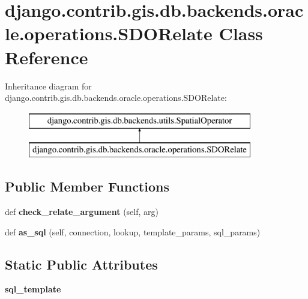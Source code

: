 \hypertarget{classdjango_1_1contrib_1_1gis_1_1db_1_1backends_1_1oracle_1_1operations_1_1_s_d_o_relate}{}\section{django.\+contrib.\+gis.\+db.\+backends.\+oracle.\+operations.\+S\+D\+O\+Relate Class Reference}
\label{classdjango_1_1contrib_1_1gis_1_1db_1_1backends_1_1oracle_1_1operations_1_1_s_d_o_relate}
Inheritance diagram for django.\+contrib.\+gis.\+db.\+backends.\+oracle.\+operations.\+S\+D\+O\+Relate\+:\begin{figure}[H]
\begin{center}
\leavevmode
\includegraphics[height=2.000000cm]{classdjango_1_1contrib_1_1gis_1_1db_1_1backends_1_1oracle_1_1operations_1_1_s_d_o_relate}
\end{center}
\end{figure}
\subsection*{Public Member Functions}
\begin{DoxyCompactItemize}
\item 
\mbox{\label{classdjango_1_1contrib_1_1gis_1_1db_1_1backends_1_1oracle_1_1operations_1_1_s_d_o_relate_a307a1b9c7b1a6c0fd05fc93335d23ea5}} 
def {\bfseries check\+\_\+relate\+\_\+argument} (self, arg)
\item 
\mbox{\label{classdjango_1_1contrib_1_1gis_1_1db_1_1backends_1_1oracle_1_1operations_1_1_s_d_o_relate_ad34a534d72a03d142f557fe409af993d}} 
def {\bfseries as\+\_\+sql} (self, connection, lookup, template\+\_\+params, sql\+\_\+params)
\end{DoxyCompactItemize}
\subsection*{Static Public Attributes}
\begin{DoxyCompactItemize}
\item 
\mbox{\label{classdjango_1_1contrib_1_1gis_1_1db_1_1backends_1_1oracle_1_1operations_1_1_s_d_o_relate_a6e7ab768eae7736090225b3de04969af}} 
{\bfseries sql\+\_\+template}
\end{DoxyCompactItemize}
